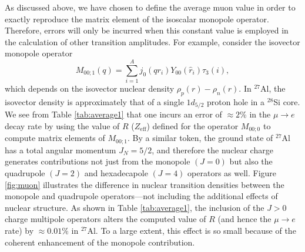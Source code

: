 \documentclass{book}[letterpaper,12pt]
\begin{document}
As discussed above, we have chosen to define the average muon value in order to exactly reproduce the matrix element of the isoscalar monopole operator. Therefore, errors will only be incurred when this constant value is employed in the calculation of other transition amplitudes. For example, consider the isovector monopole operator 
\begin{equation}
M_{00;1}(q)=\sum_{i=1}^A j_0(qr_i)Y_{00}(\hat{r}_i)\tau_3(i),
\end{equation}
which depends on the isovector nuclear density $\rho_{p}(r)-\rho_{n}(r)$. In $^{27}$Al, the isovector density is approximately that of a single $1d_{5/2}$ proton hole in a $^{28}$Si core. We see from Table \ref{tab:average1} that one incurs an error of $\approx 2$\% in the $\mu\rightarrow e$ decay rate by using the value of $R$ ($Z_\mathrm{eff}$) defined for the operator $M_{00;0}$ to compute matrix elements of $M_{00;1}$. By a similar token, the ground state of $^{27}$Al has a total angular momentum $J_N=5/2$, and therefore the nuclear charge generates contributions not just from the monopole $(J=0)$ but also the quadrupole $(J=2)$ and hexadecapole $(J=4)$ operators as well. Figure \ref{fig:muon} illustrates the difference in nuclear transition densities between the monopole and quadrupole operators---not including the additional effects of nuclear structure. As shown in Table \ref{tab:average1}, the inclusion of the $J>0$ charge multipole operators alters the computed value of $R$ (and hence the $\mu\rightarrow e$ rate) by $\approx 0.01\%$ in $^{27}$Al. To a large extent, this effect is so small because of the coherent enhancement of the monopole contribution.
\renewcommand{\arraystretch}{1.2}
\end{document}
